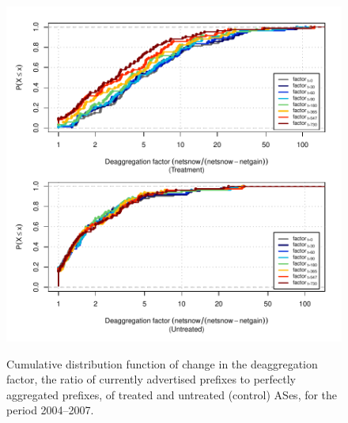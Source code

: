 \begin{figure}[H]
\begin{centering}
\begin{singlespace}
    \includegraphics[width=6in]
    {figures/behavior-deagg_factor-2004_2007-corr.pdf}
    \vspace{-2em}\\
    \caption{Cumulative distribution function of change in the deaggregation
    factor, the ratio of currently advertised prefixes to perfectly aggregated
    prefixes, of treated and untreated (control) ASes, for the period
    2004--2007.}
\end{singlespace}
\end{centering}
\end{figure}
